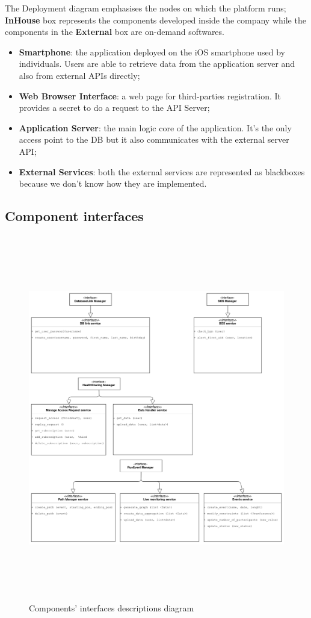 \documentclass[DD.tex]{subfiles}
\begin{document}
The Deployment diagram emphasises the nodes on which the platform runs;\\
\textbf{InHouse} box represents the components developed inside the company while 
the components in the \textbf{External} box are on-demand softwares.\\
\begin{itemize}
\item	\textbf{Smartphone}: the application deployed on the iOS smartphone used by individuals. Users are able to retrieve data from the application server and also from external APIs directly;
\item \textbf{Web Browser Interface}: a web page for third-parties registration. It provides a secret to do a request to the API Server;
\item \textbf{Application Server}: the  main logic core of the application. It’s the only access point to the DB but it also communicates with the external server API;
\item  \textbf{External Services}: both the external services are represented as  blackboxes because we don't know how they are implemented.
\end{itemize}
\newpage

	
	
\newpage
\subsection{Component interfaces}
\begin{figure}[h!]
	\centering
	\includegraphics[height=16.00cm,keepaspectratio]{Figures/Interfaces}
	\caption{Components' interfaces descriptions diagram}
\end{figure}
\end{document}
